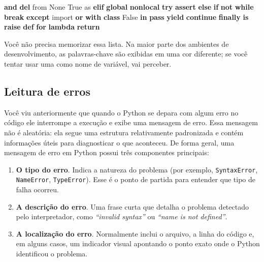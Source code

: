 \documentclass[
  brazilian,
  letterpaper,
  DIV=11,
  numbers=noendperiod]{scrreprt}
\newenvironment{Shaded}{\begin{snugshade}}{\end{snugshade}}
\newcommand{\ControlFlowTok}[1]{\textcolor[rgb]{0.00,0.23,0.31}{\textbf{#1}}}
\newcommand{\ImportTok}[1]{\textcolor[rgb]{0.00,0.46,0.62}{#1}}
\newcommand{\KeywordTok}[1]{\textcolor[rgb]{0.00,0.23,0.31}{\textbf{#1}}}
\newcommand{\VariableTok}[1]{\textcolor[rgb]{0.07,0.07,0.07}{#1}}
\providecommand{\tightlist}{%
  \setlength{\itemsep}{0pt}\setlength{\parskip}{0pt}}
\begin{document}
\begin{Shaded}
\begin{Highlighting}[]
\KeywordTok{and}         \KeywordTok{del}         \ImportTok{from}        \VariableTok{None}        \VariableTok{True}
\ImportTok{as}          \ControlFlowTok{elif}        \KeywordTok{global}      \KeywordTok{nonlocal}    \ControlFlowTok{try}
\ControlFlowTok{assert}      \ControlFlowTok{else}        \ControlFlowTok{if}          \KeywordTok{not}         \ControlFlowTok{while}
\ControlFlowTok{break}       \ControlFlowTok{except}      \ImportTok{import}      \KeywordTok{or}          \ControlFlowTok{with}
\KeywordTok{class}       \VariableTok{False}       \KeywordTok{in}          \ControlFlowTok{pass}        \ControlFlowTok{yield}
\ControlFlowTok{continue}    \ControlFlowTok{finally}     \KeywordTok{is}          \ControlFlowTok{raise}
\KeywordTok{def}         \ControlFlowTok{for}         \KeywordTok{lambda}      \ControlFlowTok{return}
\end{Highlighting}
\end{Shaded}

Você não precisa memorizar essa lista. Na maior parte dos ambientes de
desenvolvimento, as palavras-chave são exibidas em uma cor diferente; se
você tentar usar uma como nome de variável, vai perceber.

\subsection{Leitura de erros}\label{leitura-de-erros}

Você viu anteriormente que quando o Python se depara com algum erro no
código ele interrompe a execução e exibe uma mensagem de erro. Essa
mensagem não é aleatória: ela segue uma estrutura relativamente
padronizada e contém informações úteis para diagnosticar o que
aconteceu. De forma geral, uma mensagem de erro em Python possui três
componentes principais:

\begin{enumerate}
\def\labelenumi{\arabic{enumi}.}
\tightlist
\item
  \textbf{O tipo do erro}. Indica a natureza do problema (por exemplo,
  \texttt{SyntaxError}, \texttt{NameError}, \texttt{TypeError}). Esse é
  o ponto de partida para entender que tipo de falha ocorreu.
\item
  \textbf{A descrição do erro}. Uma frase curta que detalha o problema
  detectado pelo interpretador, como \emph{``invalid syntax''} ou
  \emph{``name is not defined''}.
\item
  \textbf{A localização do erro}. Normalmente inclui o arquivo, a linha
  do código e, em alguns casos, um indicador visual apontando o ponto
  exato onde o Python identificou o problema.
\end{enumerate}
\end{document}
